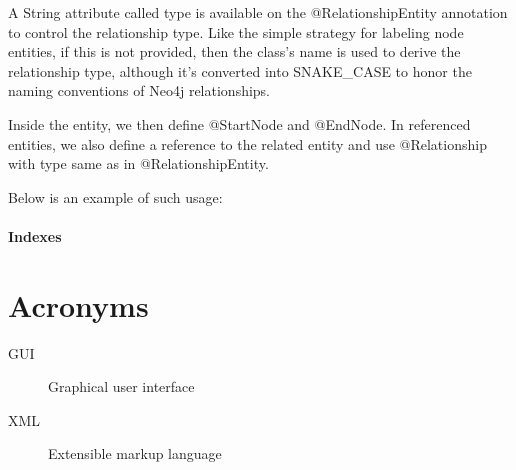 \documentclass[thesis=M,english]{FITthesis}[2019/12/23]
\begin{document}
A String attribute called type is available on the @RelationshipEntity annotation to control the relationship type. Like the simple strategy for labeling node entities,
if this is not provided, then the class's name is used to derive the relationship type, although it's converted into SNAKE\_CASE to honor
the naming conventions of Neo4j relationships. \cite{noauthor_reference_nodate}

Inside the entity, we then define @StartNode and @EndNode. In referenced entities, we also define a reference to
the related entity and use @Relationship with type same as in @RelationshipEntity.

Below is an example of such usage:


\subsubsection {Indexes}






\appendix

\chapter{Acronyms}
\begin{description}
    \item[GUI] Graphical user interface
    \item[XML] Extensible markup language
\end{description}
\end{document}
